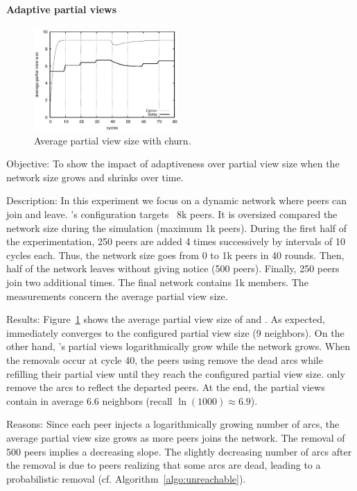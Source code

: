 \vspace{-7pt}
\paragraph{Adaptive partial views}

\begin{figure}
  \centering
  \includegraphics[width=0.49\textwidth]{img/avgpv.eps}
  \caption{\label{fig:churn}Average partial view size with churn.}
\end{figure}

\begin{asparadesc}
\item[Objective:] To show the impact of adaptiveness over partial view size when
  the network size grows and shrinks over time.
\item[Description:] In this experiment we focus on a dynamic network where peers
  can join and leave.  \CYCLON's configuration targets ~8k peers. It is
  oversized compared the network size during the simulation (maximum 1k
  peers). During the first half of the experimentation, 250 peers are added 4
  times successively by intervals of 10 cycles each. Thus, the network size goes
  from 0 to 1k peers in 40 rounds. Then, half of the network leaves without
  giving notice (500 peers). Finally, 250 peers join two additional times. The
  final network contains 1k members. The measurements concern the average
  partial view size.
\item[Results:] Figure~\ref{fig:churn} shows the average partial view size of
  \SPRAY and \CYCLON. As expected, \CYCLON immediately converges to the
  configured partial view size (9 neighbors). On the other hand, \SPRAY's
  partial views logarithmically grow while the network grows. When the removals
  occur at cycle 40, the peers using \CYCLON remove the dead arcs while
  refilling their partial view until they reach the configured partial view
  size. \SPRAY only remove the arcs to reflect the departed peers. At the end,
  the \SPRAY partial views contain in average 6.6 neighbors (recall
  $\ln(1000)\approx 6.9$).
\item[Reasons:] Since each peer injects a logarithmically growing number of
  arcs, the average partial view size grows as more peers joins the network.
  The removal of 500 peers implies a decreasing slope. The slightly decreasing
  number of arcs after the removal is due to peers realizing that some arcs are
  dead, leading to a probabilistic removal (cf. Algorithm~\ref{algo:unreachable}).
\end{asparadesc}

